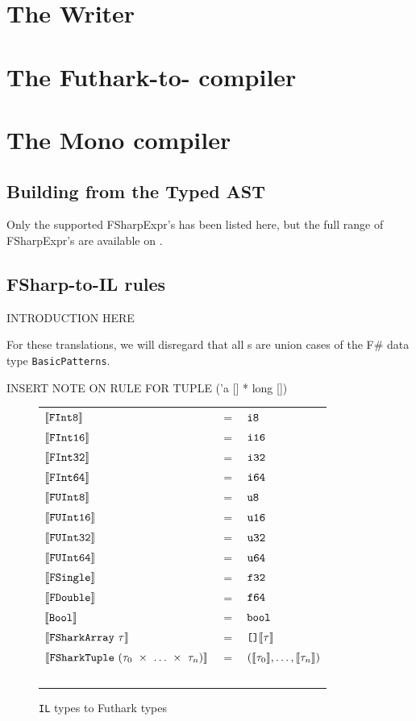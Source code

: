\section{The \fshark{}Writer}
\section{The Futhark-to-\csharp{} compiler}
\section{The Mono \csharp{} compiler}


\subsection*{Building \fshark{} from the Typed AST}
\label{sec:fsharkcompilerrules}
Only the supported FSharpExpr's has been listed here, but the full range of
FSharpExpr's are available on \cite{typedtree}.

\subsection*{FSharp-to-\fshark{}IL rules}
INTRODUCTION HERE

For these translations, we will disregard that all \fsharpexpr{}s are union
cases of the F\# data type \texttt{BasicPatterns}.



INSERT NOTE ON RULE FOR TUPLE ('a [] * long [])

\begin{figure}
  \centering
\begin{tabular}{@{}l c l}%
  $\llbracket \text{\ttfamily FInt8} \rrbracket$ & $=$ & $\text{\ttfamily i8} $ \\ 
  $\llbracket \text{\ttfamily FInt16} \rrbracket$ & $=$ & $\text{\ttfamily i16}$
  \\              
  $\llbracket \text{\ttfamily FInt32} \rrbracket$ & $=$ & $\text{\ttfamily i32} $ \\ 
  $\llbracket \text{\ttfamily FInt64} \rrbracket$ & $=$ & $\text{\ttfamily i64} $
  \\
  $\llbracket \text{\ttfamily FUInt8} \rrbracket$ & $=$ & $\text{\ttfamily u8} $ \\ 
  $\llbracket \text{\ttfamily FUInt16} \rrbracket$ & $=$ & $\text{\ttfamily u16} $ 
  \\               
  $\llbracket \text{\ttfamily FUInt32} \rrbracket$ & $=$ & $\text{\ttfamily u32} $ \\ 
  $\llbracket \text{\ttfamily FUInt64} \rrbracket$ & $=$ & $\text{\ttfamily u64} $ 
  \\
  $\llbracket \text{\ttfamily FSingle} \rrbracket$ & $=$ & $\text{\ttfamily f32} $ \\ 
  $\llbracket \text{\ttfamily FDouble} \rrbracket$ & $=$ & $\text{\ttfamily f64} $ \\
  $\llbracket \text{\ttfamily Bool} \rrbracket$ & $=$ & $\text{\ttfamily bool} $ \\ 
  $\llbracket \text{\ttfamily FSharkArray}~\tau \rrbracket$ & $=$ & $\text{\ttfamily []}\llbracket \tau \rrbracket$
  \\
  $\llbracket \text{\ttfamily {\texttt{FShark}}{}Tuple}~({\tau_0}~\times~\ldots~\times~{\tau_n}) \rrbracket$ & $=$ & $(\llbracket \tau_0 \rrbracket,\ldots,\llbracket \tau_n \rrbracket)$ \\ ~ \\
\end{tabular}
\caption{\texttt{\fshark{}IL} types to Futhark types}
\end{figure}

